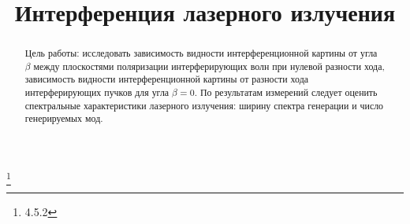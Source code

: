 


\title{Интерференция лазерного излучения}
\thanks{4.5.2}



\begin{abstract}
Цель работы: исследовать зависимость видности интерференционной картины от угла $\beta$ между плоскостями поляризации интерферирующих волн при нулевой разности хода, зависимость видности интерференционной картины от разности хода интерферирующих пучков для угла $\beta = 0$. По результатам измерений следует оценить спектральные характеристики лазерного излучения: ширину спектра генерации и число генерируемых мод.

\end{abstract}

\maketitle


